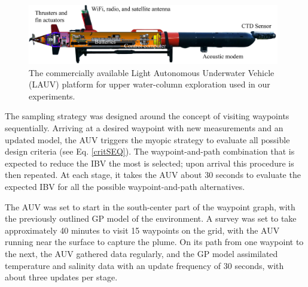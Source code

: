 \documentclass[aoas]{imsart}
\begin{document}
\begin{figure}[!h] 
\centering 
\includegraphics[width=0.98\textwidth]{Figures/harald.jpg}
\caption{The commercially available Light Autonomous Underwater
  Vehicle (LAUV) platform for upper water-column exploration used in
  our experiments.}
\label{fig:lauv}
\end{figure} 

The sampling strategy was designed around the concept of visiting
waypoints sequentially. Arriving at a desired waypoint with new
measurements and an updated model, the AUV triggers the myopic
strategy to evaluate all possible design criteria (see
Eq. \eqref{critSEQ}). The waypoint-and-path combination that is
expected to reduce the IBV the most is selected; upon arrival this
procedure is then repeated. At each stage, it takes the AUV about 30
seconds to evaluate the expected IBV for all the possible
waypoint-and-path alternatives.

The AUV was set to start in the south-center part of the waypoint
graph, with the previously outlined GP model of the environment. A
survey was set to take approximately 40 minutes to visit 15 waypoints
on the grid, with the AUV running near the surface to capture the
plume. On its path from one waypoint to the next, the AUV gathered
data regularly, and the GP model assimilated temperature and salinity
data with an update frequency of 30 seconds, with about three updates
per stage.
\end{document}
